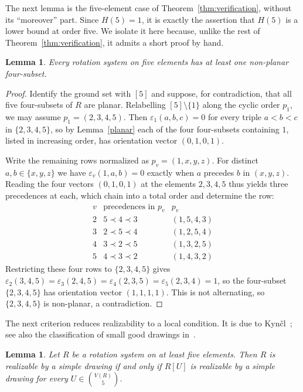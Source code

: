 \documentclass{article}
\theoremstyle{plain}
\newtheorem{lemma}[theorem]{Lemma}
\theoremstyle{definition}
\theoremstyle{remark}
\begin{document}
The next lemma is the five-element case of
Theorem~\ref{thm:verification}, without its ``moreover'' part.  Since
\(H(5)=1\), it is exactly the assertion that \(H(5)\) is a lower bound
at order five.  We isolate it here because, unlike the rest of
Theorem~\ref{thm:verification}, it admits a short proof by hand.

\begin{lemma}\label{lem:five-hand}
Every rotation system on five elements has at least one non-planar
four-subset.
\end{lemma}

\begin{proof}
Identify the ground set with \([5]\) and suppose, for contradiction,
that all five four-subsets of \(R\) are planar.  Relabelling
\([5]\setminus\{1\}\) along the cyclic order \(p_1\), we may assume
\(p_1=(2,3,4,5)\).  Then \(\varepsilon_1(a,b,c)=0\) for every triple
\(a<b<c\) in \(\{2,3,4,5\}\), so by Lemma~\ref{planar} each of the
four four-subsets containing \(1\), listed in increasing order, has
orientation vector \((0,1,0,1)\).

Write the remaining rows normalized as \(p_v=(1,x,y,z)\).  For
distinct \(a,b\in\{x,y,z\}\) we have \(\varepsilon_v(1,a,b)=0\)
exactly when \(a\) precedes \(b\) in \((x,y,z)\).  Reading the four
vectors \((0,1,0,1)\) at the elements \(2,3,4,5\) thus yields three
precedences at each, which chain into a total order and determine the
row:
\[
\begin{array}{c|c|c}
v&\text{precedences in }p_v&p_v\\ \hline
2&5\prec 4\prec 3&(1,5,4,3)\\
3&2\prec 5\prec 4&(1,2,5,4)\\
4&3\prec 2\prec 5&(1,3,2,5)\\
5&4\prec 3\prec 2&(1,4,3,2)
\end{array}
\]
Restricting these four rows to \(\{2,3,4,5\}\) gives
\(\varepsilon_2(3,4,5)=\varepsilon_3(2,4,5)=\varepsilon_4(2,3,5)
=\varepsilon_5(2,3,4)=1\), so the four-subset \(\{2,3,4,5\}\) has
orientation vector \((1,1,1,1)\).  This is not alternating, so
\(\{2,3,4,5\}\) is non-planar, a contradiction.
\end{proof}

The next criterion reduces realizability to a local condition.  It is
due to Kyn\v{c}l~\cite{Kyncl2020}; see also the classification of
small good drawings in~\cite{AbregoEtAl2015}.

\begin{lemma}\label{realizable}
Let \(R\) be a rotation system on at least five elements.  Then \(R\)
is realizable by a simple drawing if and only if \(R[U]\) is realizable
by a simple drawing for every \(U\in\binom{V(R)}5\).
\end{lemma}
\end{document}
